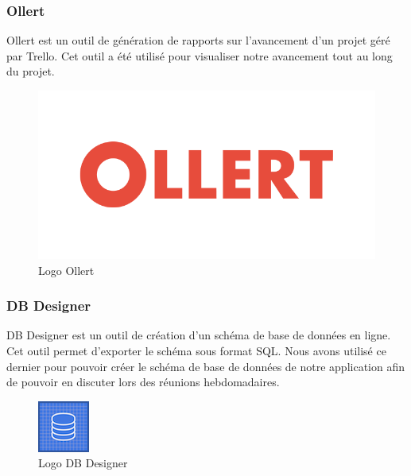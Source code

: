 \subsubsection{Ollert}
\noindent\begin{minipage}{0.69\textwidth}
Ollert est un outil de génération de rapports sur l'avancement d'un projet géré par Trello. Cet outil a été utilisé pour visualiser notre avancement tout au long du projet.
\end{minipage}
\begin{minipage}{0.3\textwidth}
\begin{figure}[H]
  \centering
  \includegraphics[scale=0.2]{figures/logo/ollert.png}
  \caption{Logo Ollert}
  \label{code30}
\end{figure}
\end{minipage}
\subsubsection{DB Designer}
\noindent\begin{minipage}{0.69\textwidth}
DB Designer est un outil de création d'un schéma de base de données en ligne. Cet outil permet d'exporter le schéma sous format SQL. Nous avons utilisé ce dernier pour pouvoir créer le schéma de base de données de notre application afin de pouvoir en discuter lors des réunions hebdomadaires.
\end{minipage}
\begin{minipage}{0.3\textwidth}
\begin{figure}[H]
  \centering
  \includegraphics[scale=1]{figures/logo/db_designer.png}
  \caption{Logo DB Designer}
  \label{code31}
\end{figure}
\end{minipage}
